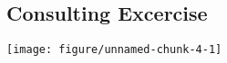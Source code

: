 \documentclass{article}\usepackage[]{graphicx}\usepackage[]{color}
\makeatletter
\def\maxwidth{ %
  \ifdim\Gin@nat@width>\linewidth
    \linewidth
  \else
    \Gin@nat@width
  \fi
}
\newenvironment{knitrout}{}{} %
\makeatother
\begin{document}
\begin{enumerate}
\section*{Consulting Excercise}

\begin{knitrout}
\color{fgcolor}

{\centering \texttt{[image: figure/unnamed-chunk-4-1]} 

}



\end{knitrout}


\end{enumerate}
\end{document}
